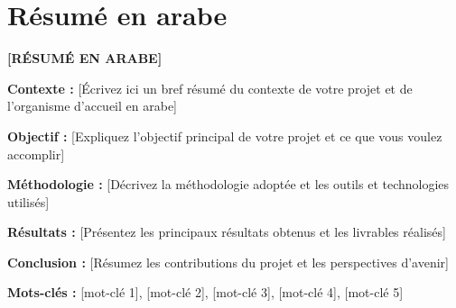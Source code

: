 \chapter*{Résumé en arabe}

\thispagestyle{empty}

\begin{center}
\textbf{[RÉSUMÉ EN ARABE]}
\end{center}

\vspace{1cm}

\textbf{Contexte :} 
[Écrivez ici un bref résumé du contexte de votre projet et de l'organisme d'accueil en arabe]

\textbf{Objectif :} 
[Expliquez l'objectif principal de votre projet et ce que vous voulez accomplir]

\textbf{Méthodologie :} 
[Décrivez la méthodologie adoptée et les outils et technologies utilisés]

\textbf{Résultats :} 
[Présentez les principaux résultats obtenus et les livrables réalisés]

\textbf{Conclusion :} 
[Résumez les contributions du projet et les perspectives d'avenir]

\vspace{1cm}

\textbf{Mots-clés :} [mot-clé 1], [mot-clé 2], [mot-clé 3], [mot-clé 4], [mot-clé 5]

\newpage
